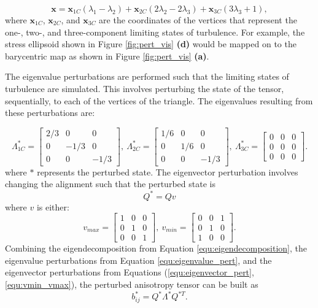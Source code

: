 \begin{equation}
    \textbf{x} = \textbf{x}_{1C} (\lambda_1 - \lambda_2) + \textbf{x}_{2C} (2\lambda_2 - 2\lambda_3) + \textbf{x}_{3C} (3\lambda_3 + 1), 
\end{equation}
where $\textbf{x}_{1C}$, $\textbf{x}_{2C}$, and $\textbf{x}_{3C}$ are the coordinates of the vertices that represent the one-, two-, and three-component limiting states of turbulence. For example, the stress ellipsoid shown in Figure \ref{fig:pert_vis} \textbf{(d)} would be mapped on to the barycentric map as shown in Figure \ref{fig:pert_vis} \textbf{(a)}.

The eigenvalue perturbations are performed such that the limiting states of turbulence are simulated. This involves perturbing the state of the tensor, sequentially, to each of the vertices of the triangle. The eigenvalues resulting from these perturbations are: 

\begin{equation}\label{equ:eigenvalue_pert}
    \Lambda^*_{1C} = 
    \begin{bmatrix}
    2/3 & 0    & 0 \\
    0   & -1/3 & 0 \\
    0   & 0    & -1/3
    \end{bmatrix},~
    \Lambda^*_{2C} = 
    \begin{bmatrix}
    1/6 & 0   & 0 \\
    0   & 1/6 & 0 \\
    0   & 0   & -1/3
    \end{bmatrix},~
    \Lambda^*_{3C} = 
    \begin{bmatrix}
    0 & 0 & 0 \\
    0 & 0 & 0 \\
    0 & 0 & 0
    \end{bmatrix}.
\end{equation}
where $*$ represents the perturbed state. The eigenvector perturbation involves changing the alignment such that the perturbed state is
\begin{equation}\label{equ:eigenvector_pert}
    Q^* = Qv
\end{equation}
where $v$ is either:
\begin{equation}\label{equ:vmin_vmax}
    v_{max} = 
    \begin{bmatrix}
    1 & 0 & 0 \\
    0 & 1 & 0 \\
    0 & 0 & 1
    \end{bmatrix},~
    v_{min} = 
    \begin{bmatrix}
    0 & 0 & 1 \\
    0 & 1 & 0 \\
    1 & 0 & 0
    \end{bmatrix}.
\end{equation}
Combining the eigendecomposition from Equation \eqref{equ:eigendecomposition}, the eigenvalue perturbations from Equation \eqref{equ:eigenvalue_pert}, and the eigenvector perturbations from Equations (\ref{equ:eigenvector_pert}, \ref{equ:vmin_vmax}), the perturbed anisotropy tensor can be built as
\begin{equation}
    b^*_{ij}=Q^* \Lambda^* Q^{*T}.
\end{equation}

